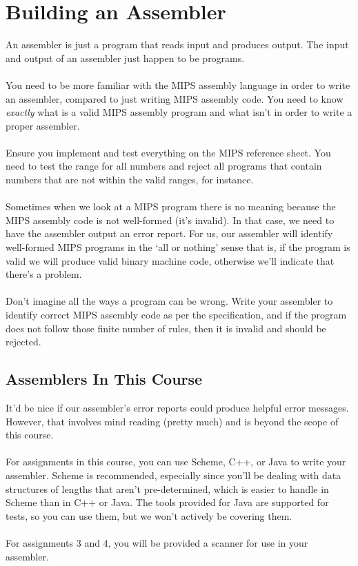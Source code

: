 \documentclass[]{article}
\theoremstyle{definition}
\newcommand{\lecture}[1]{\marginpar{{\footnotesize $\leftarrow$ \underline{#1}}}}
\begin{document}
	\section{Building an Assembler} \lecture{January 21, 2013}
		An assembler is just a program that reads input and produces output. The input and output of an assembler just happen to be programs.
		\\ \\
		You need to be more familiar with the MIPS assembly language in order to write an assembler, compared to just writing MIPS assembly code. You need to know \emph{exactly} what is a valid MIPS assembly program and what isn't in order to write a proper assembler.
		\\ \\
		Ensure you implement and test everything on the MIPS reference sheet. You need to test the range for all numbers and reject all programs that contain numbers that are not within the valid ranges, for instance.
		\\ \\
		Sometimes when we look at a MIPS program there is no meaning because the MIPS assembly code is not well-formed (it's invalid). In that case, we need to have the assembler output an error report. For us, our assembler will identify well-formed MIPS programs in the `all or nothing' sense \textendash{} that is, if the program is valid we will produce valid binary machine code, otherwise we'll indicate that there's a problem.
		\\ \\
		Don't imagine all the ways a program can be wrong. Write your assembler to identify correct MIPS assembly code as per the specification, and if the program does not follow those finite number of rules, then it is invalid and should be rejected.
		
		\subsection{Assemblers In This Course}
			It'd be nice if our assembler's error reports could produce helpful error messages. However, that involves mind reading (pretty much) and is beyond the scope of this course.
			\\ \\
			For assignments in this course, you can use Scheme, C++, or Java to write your assembler. Scheme is recommended, especially since you'll be dealing with data structures of lengths that aren't pre-determined, which is easier to handle in Scheme than in C++ or Java. The tools provided for Java are supported for tests, so you can use them, but we won't actively be covering them.
			\\ \\
			For assignments 3 and 4, you will be provided a scanner for use in your assembler.
\end{document}
